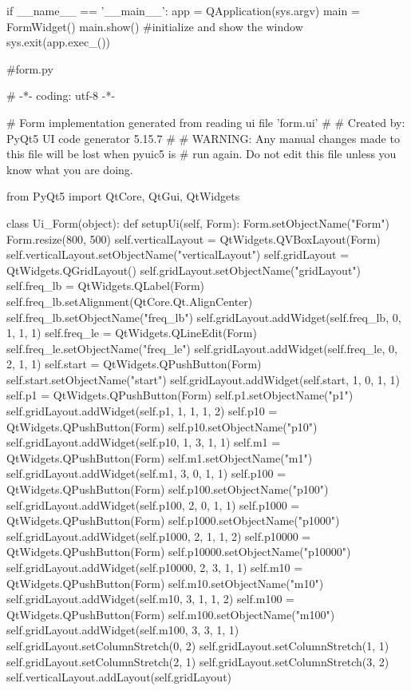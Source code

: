 \documentclass{article}
\begin{document}
\begin{appendices}
\begin{python}
    if __name__ == '__main__':
        app = QApplication(sys.argv)
        main = FormWidget()
        main.show() #initialize and show the window
        sys.exit(app.exec_())
    \end{python}
    \begin{python}
    #form.py

    
    # -*- coding: utf-8 -*-

    # Form implementation generated from reading ui file 'form.ui'
    #
    # Created by: PyQt5 UI code generator 5.15.7
    #
    # WARNING: Any manual changes made to this file will be lost when pyuic5 is
    # run again.  Do not edit this file unless you know what you are doing.


    from PyQt5 import QtCore, QtGui, QtWidgets


    class Ui_Form(object):
        def setupUi(self, Form):
            Form.setObjectName("Form")
            Form.resize(800, 500)
            self.verticalLayout = QtWidgets.QVBoxLayout(Form)
            self.verticalLayout.setObjectName("verticalLayout")
            self.gridLayout = QtWidgets.QGridLayout()
            self.gridLayout.setObjectName("gridLayout")
            self.freq_lb = QtWidgets.QLabel(Form)
            self.freq_lb.setAlignment(QtCore.Qt.AlignCenter)
            self.freq_lb.setObjectName("freq_lb")
            self.gridLayout.addWidget(self.freq_lb, 0, 1, 1, 1)
            self.freq_le = QtWidgets.QLineEdit(Form)
            self.freq_le.setObjectName("freq_le")
            self.gridLayout.addWidget(self.freq_le, 0, 2, 1, 1)
            self.start = QtWidgets.QPushButton(Form)
            self.start.setObjectName("start")
            self.gridLayout.addWidget(self.start, 1, 0, 1, 1)
            self.p1 = QtWidgets.QPushButton(Form)
            self.p1.setObjectName("p1")
            self.gridLayout.addWidget(self.p1, 1, 1, 1, 2)
            self.p10 = QtWidgets.QPushButton(Form)
            self.p10.setObjectName("p10")
            self.gridLayout.addWidget(self.p10, 1, 3, 1, 1)
            self.m1 = QtWidgets.QPushButton(Form)
            self.m1.setObjectName("m1")
            self.gridLayout.addWidget(self.m1, 3, 0, 1, 1)
            self.p100 = QtWidgets.QPushButton(Form)
            self.p100.setObjectName("p100")
            self.gridLayout.addWidget(self.p100, 2, 0, 1, 1)
            self.p1000 = QtWidgets.QPushButton(Form)
            self.p1000.setObjectName("p1000")
            self.gridLayout.addWidget(self.p1000, 2, 1, 1, 2)
            self.p10000 = QtWidgets.QPushButton(Form)
            self.p10000.setObjectName("p10000")
            self.gridLayout.addWidget(self.p10000, 2, 3, 1, 1)
            self.m10 = QtWidgets.QPushButton(Form)
            self.m10.setObjectName("m10")
            self.gridLayout.addWidget(self.m10, 3, 1, 1, 2)
            self.m100 = QtWidgets.QPushButton(Form)
            self.m100.setObjectName("m100")
            self.gridLayout.addWidget(self.m100, 3, 3, 1, 1)
            self.gridLayout.setColumnStretch(0, 2)
            self.gridLayout.setColumnStretch(1, 1)
            self.gridLayout.setColumnStretch(2, 1)
            self.gridLayout.setColumnStretch(3, 2)
            self.verticalLayout.addLayout(self.gridLayout)


\end{python}
\end{appendices}
\end{document}
